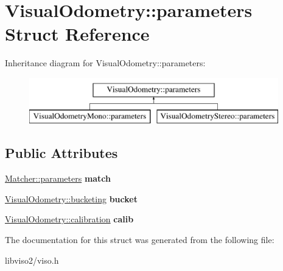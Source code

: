 \hypertarget{struct_visual_odometry_1_1parameters}{\section{Visual\+Odometry\+:\+:parameters Struct Reference}
\label{struct_visual_odometry_1_1parameters}
}
Inheritance diagram for Visual\+Odometry\+:\+:parameters\+:\begin{figure}[H]
\begin{center}
\leavevmode
\includegraphics[height=2.000000cm]{struct_visual_odometry_1_1parameters}
\end{center}
\end{figure}
\subsection*{Public Attributes}
\begin{DoxyCompactItemize}
\item 
\hypertarget{struct_visual_odometry_1_1parameters_a6f734b57e08de115d0685f2d9aea7fa3}{\hyperlink{struct_matcher_1_1parameters}{Matcher\+::parameters} {\bfseries match}}\label{struct_visual_odometry_1_1parameters_a6f734b57e08de115d0685f2d9aea7fa3}

\item 
\hypertarget{struct_visual_odometry_1_1parameters_acc2eb54e9b22b1fdbdc83e7291b50d25}{\hyperlink{struct_visual_odometry_1_1bucketing}{Visual\+Odometry\+::bucketing} {\bfseries bucket}}\label{struct_visual_odometry_1_1parameters_acc2eb54e9b22b1fdbdc83e7291b50d25}

\item 
\hypertarget{struct_visual_odometry_1_1parameters_ad8fc3a97b88dc295c2dd1a8d027e2848}{\hyperlink{struct_visual_odometry_1_1calibration}{Visual\+Odometry\+::calibration} {\bfseries calib}}\label{struct_visual_odometry_1_1parameters_ad8fc3a97b88dc295c2dd1a8d027e2848}

\end{DoxyCompactItemize}


The documentation for this struct was generated from the following file\+:\begin{DoxyCompactItemize}
\item 
libviso2/viso.\+h\end{DoxyCompactItemize}
